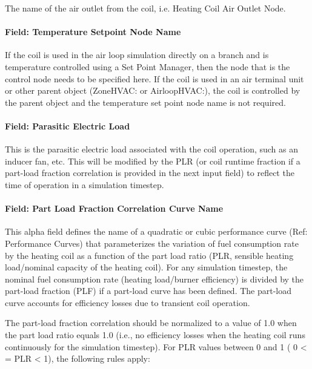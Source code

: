 The name of the air outlet from the coil, i.e. Heating Coil Air Outlet Node.

\paragraph{Field: Temperature Setpoint Node Name}\label{field-temperature-setpoint-node-name-4}

If the coil is used in the air loop simulation directly on a branch and is temperature controlled using a Set Point Manager, then the node that is the control node needs to be specified here. If the coil is used in an air terminal unit or other parent object (ZoneHVAC: or AirloopHVAC:), the coil is controlled by the parent object and the temperature set point node name is not required.

\paragraph{Field: Parasitic Electric Load}\label{field-parasitic-electric-load-1}

This is the parasitic electric load associated with the coil operation, such as an inducer fan, etc. This will be modified by the PLR (or coil runtime fraction if a part-load fraction correlation is provided in the next input field) to reflect the time of operation in a simulation timestep.

\paragraph{Field: Part Load Fraction Correlation Curve Name}\label{field-part-load-fraction-correlation-curve-name}

This alpha field defines the name of a quadratic or cubic performance curve (Ref: Performance Curves) that parameterizes the variation of fuel consumption rate by the heating coil as a function of the part load ratio (PLR, sensible heating load/nominal capacity of the heating coil). For any simulation timestep, the nominal fuel consumption rate (heating load/burner efficiency) is divided by the part-load fraction (PLF) if a part-load curve has been defined. The part-load curve accounts for efficiency losses due to transient coil operation.

The part-load fraction correlation should be normalized to a value of 1.0 when the part load ratio equals 1.0 (i.e., no efficiency losses when the heating coil runs continuously for the simulation timestep). For PLR values between 0 and 1 ( 0 \textless{} = PLR \textless{} 1), the following rules apply:

